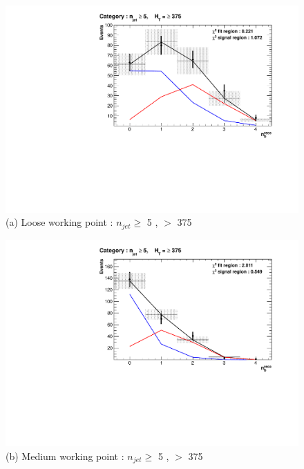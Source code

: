 \begin{figure}[ht]
\footnotesize
\centering
\begin{minipage}[b]{0.51 \linewidth}
\includegraphics[width = 1.0\linewidth]{plots/TemplatesSignal/Final_Fit_To_Data_Normal_Loose_HTBin_Template_375_jet_mult_5.pdf}
\centering (a) Loose working point : $n_{jet} \geq$  5 , \theht $>$ 375
\end{minipage}
\footnotesize
\begin{minipage}[b]{0.51\linewidth}
\includegraphics[width = 1.0\linewidth]{plots/TemplatesSignal/Final_Fit_To_Data_Normal_Medium_HTBin_Template_375_jet_mult_5.pdf}
\centering (b) Medium working point : $n_{jet} \geq$ 5 , \theht $>$ 375 
\end{minipage}
\quad
\begin{minipage}[b]{0.51\linewidth}

\end{minipage}
\end{figure}
